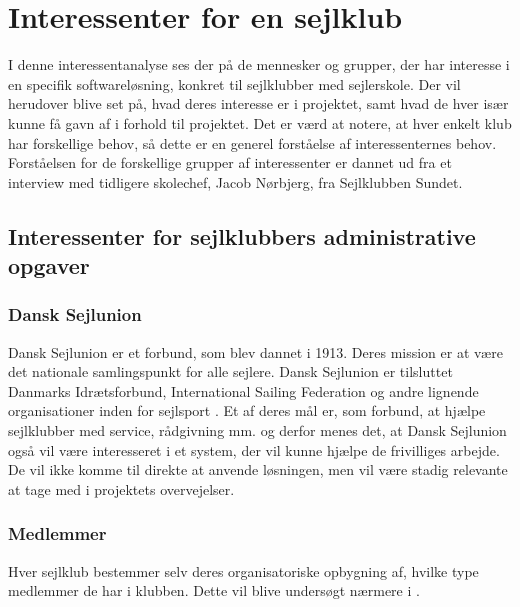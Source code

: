 \chapter{Interessenter for en sejlklub}\label{chap:interessent-analyse-ved-sejlklubber}

I denne interessentanalyse ses der på de mennesker og grupper, der har interesse i en specifik softwareløsning, konkret til sejlklubber med sejlerskole.
Der vil herudover blive set på, hvad deres interesse er i projektet, samt hvad de hver især kunne få gavn af i forhold til projektet.
Det er værd at notere, at hver enkelt klub har forskellige behov, så dette er en generel forståelse af interessenternes behov.
Forståelsen for de forskellige grupper af interessenter er dannet ud fra et interview med tidligere skolechef, Jacob Nørbjerg, fra Sejlklubben Sundet.


\section{Interessenter for sejlklubbers administrative opgaver}


\subsection{Dansk Sejlunion}

Dansk Sejlunion er et forbund, som blev dannet i 1913. Deres mission er at være det nationale samlingspunkt for alle sejlere. 
Dansk Sejlunion er tilsluttet Danmarks Idrætsforbund, International Sailing Federation og andre lignende organisationer inden for sejlsport \citep{Sejlsportdk}.
Et af deres mål er, som forbund, at hjælpe sejlklubber med service, rådgivning mm. og derfor menes det, at Dansk Sejlunion også vil være interesseret i et system, der vil kunne hjælpe de frivilliges arbejde. 
De vil ikke komme til direkte at anvende løsningen, men vil være stadig relevante at tage med i projektets overvejelser. 


\subsection{Medlemmer}\label{subsec:interessent-medlemmer}

Hver sejlklub bestemmer selv deres organisatoriske opbygning af, hvilke type medlemmer de har i klubben.
Dette vil blive undersøgt nærmere i . 

